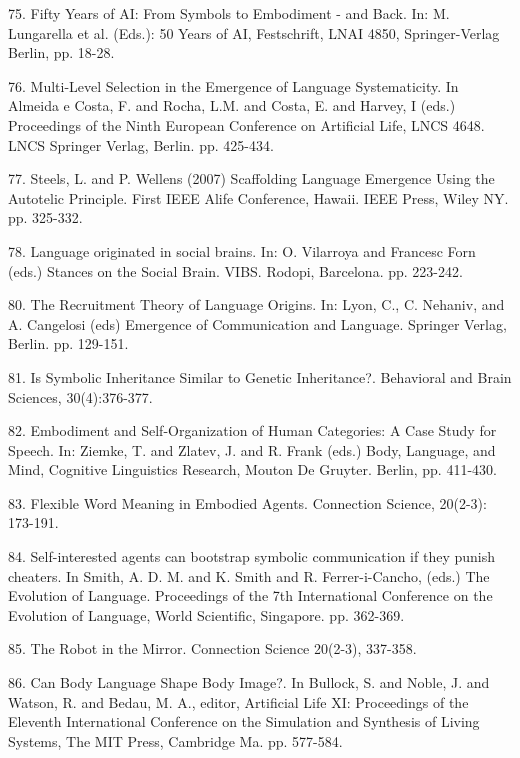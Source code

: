 75. \citet{Steels:07c} Fifty Years of AI: From Symbols to Embodiment - and Back.  In: M. Lungarella et al. (Eds.): 50 Years of AI, Festschrift, LNAI 4850, Springer-Verlag Berlin, pp. 18-28. 

76. \citet{vantrijp:07d} Multi-Level Selection in the Emergence of Language Systematicity. In Almeida e Costa, F. and Rocha, L.M. and Costa, E. and Harvey, I (eds.) Proceedings of the Ninth European Conference on Artificial Life, LNCS 4648.
LNCS Springer Verlag, Berlin. pp. 425-434. 

77. \citet{Steels:07e} Steels, L. and P. Wellens (2007) Scaffolding Language Emergence Using the Autotelic Principle. 
First IEEE Alife Conference, Hawaii. IEEE Press, Wiley NY. pp. 325-332. 

78. \citet{Steels:07f} Language originated in social brains. In: O. Vilarroya and Francesc Forn (eds.) Stances on the Social Brain. VIBS. Rodopi, Barcelona. pp. 223-242. 

80. \citet{Steels:07g} The Recruitment Theory of Language Origins. In: Lyon, C., C. Nehaniv, and A. Cangelosi (eds) Emergence of Communication and Language. Springer Verlag, Berlin. pp. 129-151. 

81. \citet{Steels:07h} Is Symbolic Inheritance Similar to Genetic Inheritance?. Behavioral and Brain Sciences, 30(4):376-377.

\enlargethispage{2em}
82. \citet{Steels:07i} Embodiment and Self-Organization of Human Categories: A Case Study for Speech. In: Ziemke, T. and Zlatev, J. and R. Frank (eds.) Body, Language, and Mind, Cognitive Linguistics Research, Mouton De Gruyter. Berlin, pp. 411-430. 

83. \citet{Wellens:08a} Flexible Word Meaning in Embodied Agents. Connection Science, 20(2-3): 173-191. 

84. \citet{Wang:08b} Self-interested agents can bootstrap symbolic communication if they punish cheaters. In Smith, A. D. M. and K. Smith and R. Ferrer-i-Cancho, (eds.) The Evolution of Language. Proceedings of the 7th International Conference on the Evolution of Language, World Scientific, Singapore. pp. 362-369. 

85. \citet{Steels:08c} The Robot in the Mirror. Connection Science 20(2-3), 337-358. 

86. \citet{Steels:08d} Can Body Language Shape Body Image?. In Bullock, S. and Noble, J. and Watson, R. and 
Bedau, M. A., editor, Artificial Life XI: Proceedings of the Eleventh International Conference on the Simulation and 
Synthesis of Living Systems, The MIT Press, Cambridge Ma. pp. 577-584. 

